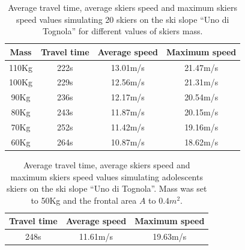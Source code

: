 \documentclass[12pt,a4paper,twoside]{book}
\begin{document}
\begin{table}[!t]
  \centering
  \begin{tabular}{ | c | c | c | c | }
    \hline
    Mass & Travel time & Average speed & Maximum speed \\
    \hline
    110Kg & 222s & 13.01m/s & 21.47m/s \\
    \hline
    100Kg & 229s & 12.56m/s & 21.31m/s \\
    \hline
    90Kg & 236s & 12.17m/s & 20.54m/s \\
    \hline
    80Kg & 243s & 11.87m/s & 20.15m/s \\
    \hline
    70Kg & 252s & 11.42m/s & 19.16m/s \\
    \hline
    60Kg & 264s & 10.87m/s & 18.62m/s \\
    \hline
  \end{tabular}
  \caption{Average travel time, average skiers speed and maximum skiers speed values simulating 20 skiers on the ski slope ``Uno di Tognola'' for different values of skiers mass.}
\end{table}
\begin{table}[!h]
  \centering
  \begin{tabular}{ | c | c | c | }
    \hline
    Travel time & Average speed & Maximum speed \\
    \hline
    248s & 11.61m/s & 19.63m/s \\
    \hline
  \end{tabular}
  \caption{Average travel time, average skiers speed and maximum skiers speed values simulating adolescents skiers on the ski slope ``Uno di Tognola''. Mass was set to 50Kg and the frontal area $A$ to $0.4 m^2$.}
\end{table}
\end{document}
